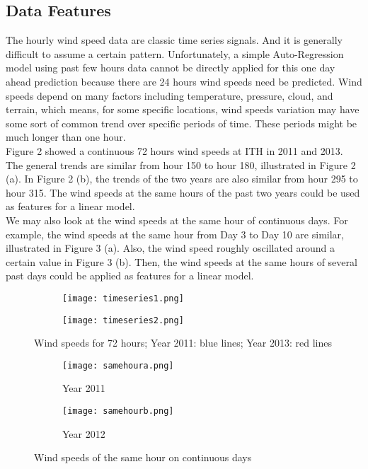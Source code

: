 \documentclass{article}
\begin{document}
\subsection*{Data Features}
The hourly wind speed data are classic time series signals.  And it is generally difficult to assume a certain pattern.  Unfortunately, a simple Auto-Regression model using past few hours data cannot be directly applied for this one day ahead prediction because there are 24 hours wind speeds need be predicted.  Wind speeds depend on many factors including temperature, pressure, cloud, and terrain, which means, for some specific locations, wind speeds variation may have some sort of common trend over specific periods of time.  These periods might be much longer than one hour.\\
Figure 2 showed a continuous 72 hours wind speeds at ITH in 2011 and 2013.  The general trends are similar from hour 150 to hour 180, illustrated in Figure 2 (a). In Figure 2 (b), the trends of the two years are also similar from hour 295 to hour 315.  The wind speeds at the same hours of the past two years could be used as features for a linear model.\\
We may also look at the wind speeds at the same hour of continuous days.  For example, the wind speeds at the same hour from Day 3 to Day 10 are similar, illustrated in Figure 3 (a).  Also, the wind speed roughly oscillated around a certain value in Figure 3 (b).  Then, the wind speeds at the same hours of several past days could be applied as features for a linear model.\\

\begin{figure}[h]
  \begin{subfigure}[b]{0.5\textwidth}
    \texttt{[image: timeseries1.png]}
    \caption{}
    \label{fig:f1}
  \end{subfigure}
  \hfill
  \begin{subfigure}[b]{0.5\textwidth}
    \texttt{[image: timeseries2.png]}
    \caption{}
    \label{fig:f2}
  \end{subfigure}
  \caption{Wind speeds for 72 hours; Year 2011: blue lines; Year 2013: red lines}
\end{figure}

\begin{figure}[h]
  \begin{subfigure}[b]{0.5\textwidth}
    \texttt{[image: samehoura.png]}
    \caption{Year 2011}
    \label{fig:f1}
  \end{subfigure}
  \hfill
  \begin{subfigure}[b]{0.5\textwidth}
    \texttt{[image: samehourb.png]}
    \caption{Year 2012}
    \label{fig:f2}
  \end{subfigure}
  \caption{Wind speeds of the same hour on continuous days}
\end{figure}
\end{document}

